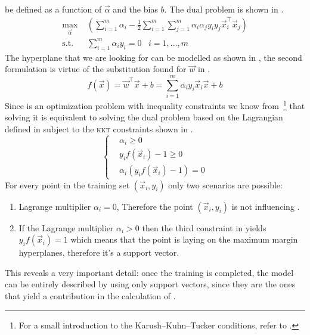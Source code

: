 be defined as a function of $\vec{\alpha}$ and the bias $b$. The dual problem is shown in .
\begin{equation}
	\label{eq:dual}
	\begin{aligned}
		\max_{\vec{\alpha}}       & \left(\sum_{i = 1}^{m}{\alpha_i} - \frac{1}{2}\sum_{i =
		1}^{m}\sum_{j = 1}^{m}{\alpha_i\alpha_j y_i y_j \vec{x}_i^\top\vec{x}_j}\right)               \\
		\text{s.t.} \hspace{10pt} & \sum_{i = 1}^{m}{\alpha_i y_i} = 0 \hspace{10pt} i = 1, \ldots, m
	\end{aligned}
\end{equation}
The hyperplane that we are looking for can be modelled as shown in , the second
formulation is virtue of the substitution found for $\vec{w}$ in .
\begin{equation}
	\label{eq:of}
	f(\vec{x}) = \vec{w}^\top\vec{x} + b = \sum_{i = 1}^m\alpha_iy_i\vec{x}_i\vec{x} + b
\end{equation}
Since  is an optimization problem with inequality constraints we
know from~\cite{kkt1951}\footnote{For a small introduction to the Karush--Kuhn--Tucker conditions,
refer to .} that solving it is equivalent to solving the dual problem based on the
Lagrangian defined in  subject to the \textsc{kkt} constraints shown in
.
\begin{equation}
	\label{eq:kkt-constraints}
	\begin{cases}
		 & \alpha_i \geq 0                   \\
		 & y_if(\vec{x}_i) - 1 \geq 0        \\
		 & \alpha_i(y_if(\vec{x}_i) - 1) = 0
	\end{cases}
\end{equation}
For every point in the training set $(\vec{x}_i, y_i)$ only two scenarios are possible:
\begin{enumerate}
	\item Lagrange multiplier $\alpha_i = 0$, Therefore the point $(\vec{x}_i, y_i)$ is not
		influencing .
	\item If the Lagrange multiplier $\alpha_i > 0$ then the third constraint in
	       yields $y_if(\vec{x}_i) = 1$ which means that the point is
	      laying on the maximum margin hyperplanes, therefore it's a support vector.
\end{enumerate}
This reveals a very important detail: once the training is completed, the model can be entirely
described by using only support vectors, since they are the ones that yield a contribution in the
calculation of .

